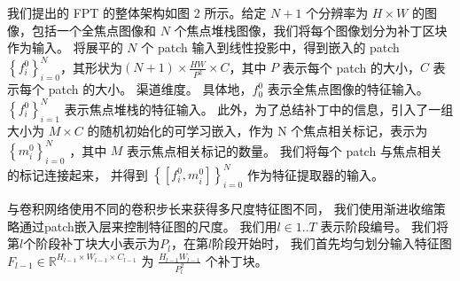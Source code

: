 %
%
%
%
%
我们提出的 FPT 的整体架构如图 2 所示。给定 $N + 1$ 个分辨率为 $ H \times W $ 的图像，包括一个全焦点图像和 $N$ 个焦点堆栈图像，我们将每个图像划分为补丁区块作为输入。 
将展平的 $N$ 个 patch 输入到线性投影中，得到嵌入的 patch $ \left \{ f_{i}^{0} \right \}_{i=0}^{N} $，其形状为$ \left ( N + 1 \right ) \times \frac{HW}{P^{2}} \times C  $，其中 $P$ 表示每个 patch 的大小，$C$ 表示每个 patch 的大小。 
渠道维度。 
%
%
%
具体地，$ f_{0}^{0} $ 表示全焦点图像的特征输入。 
$ \left \{ f_{i}^{0} \right \}_{i=1}^{N} $ 表示焦点堆栈的特征输入。 
此外，为了总结补丁中的信息，引入了一组大小为 $ M \times C $ 的随机初始化的可学习嵌入，作为 { }N 个焦点相关标记，表示为 $ \left \{ m_{i}^{0} \right \}_{i=0}^{N} $ ，其中 $M$ 表示焦点相关标记的数量。 
我们将每个 patch 与焦点相关的标记连接起来，
并得到 $ \left \{ \left [ f_{i}^{0},m_{i}^{0}  \right ]  \right \}_{i=0}^{N} $ 作为特征提取器的输入。 
%
%
%
%
%
\par
%
%
与卷积网络使用不同的卷积步长来获得多尺度特征图不同，
我们使用渐进收缩策略通过patch嵌入层来控制特征图的尺度。
我们用$ l \in 1..T $ 表示阶段编号。 
我们将第$l$个阶段补丁块大小表示为$P_{l}$，在第$l$阶段开始时，
我们首先均匀划分输入特征图
$F_{l-1} \in \mathbb{R}^{H_{l-1} \times W_{l-1} \times C_{l-1}}$
为
$ \frac{H_{l-1}W_{l-1}}{P_{l}^{2}} $
个补丁块。

